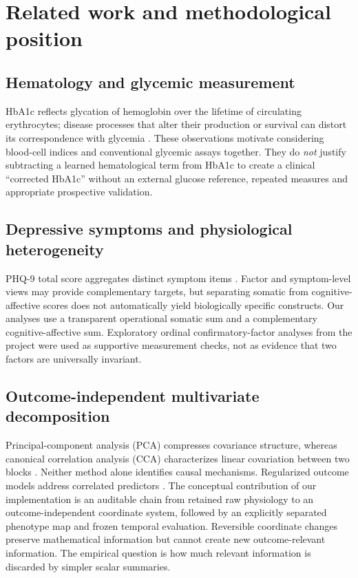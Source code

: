 \documentclass[11pt,a4paper]{article}
\begin{document}
\section{Related work and methodological position}
\subsection{Hematology and glycemic measurement}
HbA1c reflects glycation of hemoglobin over the lifetime of circulating erythrocytes; disease processes that alter their production or survival can distort its correspondence with glycemia \cite{ada2024}. These observations motivate considering blood-cell indices and conventional glycemic assays together. They do \emph{not} justify subtracting a learned hematological term from HbA1c to create a clinical ``corrected HbA1c'' without an external glucose reference, repeated measures and appropriate prospective validation.

\subsection{Depressive symptoms and physiological heterogeneity}
PHQ-9 total score aggregates distinct symptom items \cite{kroenke2001}. Factor and symptom-level views may provide complementary targets, but separating somatic from cognitive-affective scores does not automatically yield biologically specific constructs. Our analyses use a transparent operational somatic sum and a complementary cognitive-affective sum. Exploratory ordinal confirmatory-factor analyses from the project were used as supportive measurement checks, not as evidence that two factors are universally invariant.

\subsection{Outcome-independent multivariate decomposition}
Principal-component analysis (PCA) compresses covariance structure, whereas canonical correlation analysis (CCA) characterizes linear covariation between two blocks \cite{hotelling1936}. Neither method alone identifies causal mechanisms. Regularized outcome models address correlated predictors \cite{hoerl1970}. The conceptual contribution of our implementation is an auditable chain from retained raw physiology to an outcome-independent coordinate system, followed by an explicitly separated phenotype map and frozen temporal evaluation. Reversible coordinate changes preserve mathematical information but cannot create new outcome-relevant information. The empirical question is how much relevant information is discarded by simpler scalar summaries.
\end{document}
